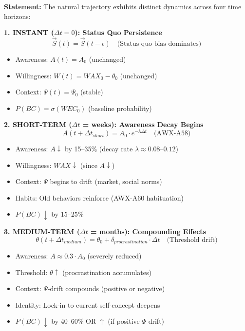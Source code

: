 \documentclass[11pt, a4paper]{article}
\begin{document}
\begin{tcolorbox}[colback=blue!5!white, colframe=blue!75!black,
    title=\textbf{Axiom NTM-A1: Four Time Horizons of Natural Dynamics}]

\textbf{Statement:} The natural trajectory exhibits distinct dynamics across four time horizons:

\vspace{0.5em}
\textbf{1. INSTANT ($\Delta t = 0$): Status Quo Persistence}
\begin{equation}
\vec{S}(t) = \vec{S}(t-\epsilon) \quad \text{(Status quo bias dominates)}
\end{equation}
\begin{itemize}[nosep]
\item Awareness: $A(t) = A_0$ (unchanged)
\item Willingness: $W(t) = WAX_0 - \theta_0$ (unchanged)
\item Context: $\Psi(t) = \Psi_0$ (stable)
\item $P(BC) = \sigma(WEC_0)$ (baseline probability)
\end{itemize}

\vspace{0.5em}
\textbf{2. SHORT-TERM ($\Delta t$ = weeks): Awareness Decay Begins}
\begin{equation}
A(t + \Delta t_{short}) = A_0 \cdot e^{-\lambda \Delta t} \quad \text{(AWX-A58)}
\end{equation}
\begin{itemize}[nosep]
\item Awareness: $A \downarrow$ by 15--35\% (decay rate $\lambda \approx 0.08$--$0.12$)
\item Willingness: $WAX \downarrow$ (since $A \downarrow$)
\item Context: $\Psi$ begins to drift (market, social norms)
\item Habits: Old behaviors reinforce (AWX-A60 habituation)
\item $P(BC) \downarrow$ by 15--25\%
\end{itemize}

\vspace{0.5em}
\textbf{3. MEDIUM-TERM ($\Delta t$ = months): Compounding Effects}
\begin{equation}
\theta(t + \Delta t_{medium}) = \theta_0 + \delta_{procrastination} \cdot \Delta t \quad \text{(Threshold drift)}
\end{equation}
\begin{itemize}[nosep]
\item Awareness: $A \approx 0.3 \cdot A_0$ (severely reduced)
\item Threshold: $\theta \uparrow$ (procrastination accumulates)
\item Context: $\Psi$-drift compounds (positive or negative)
\item Identity: Lock-in to current self-concept deepens
\item $P(BC) \downarrow$ by 40--60\% OR $\uparrow$ (if positive $\Psi$-drift)
\end{itemize}


\end{tcolorbox}
\end{document}
